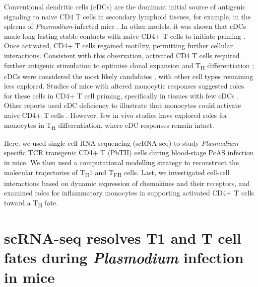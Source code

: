 Conventional dendritic cells (cDCs) are the dominant initial source of antigenic signaling to naive CD4 T cells in secondary lymphoid tissues, for example, in the spleens of \textit{Plasmodium}-infected mice \cite{DeWalick2007-mu}. In other models, it was shown that cDCs made long-lasting stable contacts with naive CD4+ T cells to initiate priming \cite{Celli2007-dp}. Once activated, CD4+ T cells regained motility, permitting further cellular interactions. Consistent with this observation, activated CD4 T cells required further antigenic stimulation to optimise clonal expansion and T\textsubscript{H} differentiation \cite{Bajenoff2002-om}; cDCs were considered the most likely candidates \cite{Celli2007-dp, Groom2012-az}, with other cell types remaining less explored. Studies of mice with altered monocytic responses suggested roles for these cells in CD4+ T cell priming, specifically in tissues with few cDCs \cite{Hohl2009-wg}. Other reports used cDC deficiency to illustrate that monocytes could activate naive CD4+ T cells \cite{Nakano2009-rg}. However, few in vivo studies have explored roles for monocytes in T\textsubscript{H} differentiation, where cDC responses remain intact.

Here, we used single-cell RNA sequencing (scRNA-seq) to study \textit{Plasmodium}-specific TCR transgenic CD4+ T (PbTII) cells during blood-stage PcAS infection in mice. We then used a computational modelling strategy to reconstruct the molecular trajectories of T\textsubscript{H}1 and T\textsubscript{FH} cells. Last, we investigated cell-cell interactions based on dynamic expression of chemokines and their receptors, and examined roles for inflammatory monocytes in supporting activated CD4+ T cells toward a T\textsubscript{H} fate.

\section{scRNA-seq resolves \texorpdfstring{T1}{TH1} and \texorpdfstring{T}{TFH} cell fates during \textit{Plasmodium} infection in mice}

